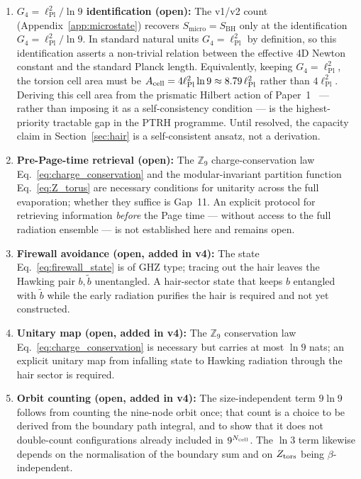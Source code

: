\documentclass[11pt,a4paper]{article}
\begin{document}
\begin{enumerate}[leftmargin=*, label=\arabic*.]
  \item \textbf{$G_4 = \ell_{\mathrm{Pl}}^2/\ln 9$ identification (open):}
    The v1/v2 count (Appendix~\ref{app:microstate}) recovers $S_{\mathrm{micro}} = S_{\mathrm{BH}}$
    only at the identification $G_4 = \ell_{\mathrm{Pl}}^2/\ln 9$.  In
    standard natural units $G_4 = \ell_{\mathrm{Pl}}^2$ by definition, so this
    identification asserts a non-trivial relation between the effective 4D Newton
    constant and the standard Planck length.  Equivalently, keeping $G_4 = \ell_{\mathrm{Pl}}^2$, the torsion
    cell area must be $A_{\rm cell} = 4\ell_{\mathrm{Pl}}^2\ln 9 \approx 8.79\,\ell_{\mathrm{Pl}}^2$
    rather than $4\ell_{\mathrm{Pl}}^2$. Deriving this cell area from the
    prismatic Hilbert action of Paper~1~\cite{BresslerPrismatic2026} --- rather
    than imposing it as a self-consistency condition --- is the highest-priority
    tractable gap in the PTRH programme.  Until resolved, the capacity
    claim in Section~\ref{sec:hair} is a self-consistent ansatz, not a
    derivation.

  \item \textbf{Pre-Page-time retrieval (open):} The $\mathbb{Z}_9$
    charge-conservation law Eq.~\eqref{eq:charge_conservation} and
    the modular-invariant partition function Eq.~\eqref{eq:Z_torus} are
    necessary conditions for unitarity across the full evaporation; whether
    they suffice is Gap~11.  An explicit protocol
    for retrieving information \emph{before} the Page time --- without
    access to the full radiation ensemble --- is not established here and
    remains open.

  \item \textbf{Firewall avoidance (open, added in v4):} The state
    Eq.~\eqref{eq:firewall_state} is of GHZ type; tracing out the hair leaves the
    Hawking pair $b,\tilde b$ unentangled.  A hair-sector state that keeps $b$
    entangled with $\tilde b$ while the early radiation purifies the hair is
    required and not yet constructed.

  \item \textbf{Unitary map (open, added in v4):} The $\mathbb{Z}_9$ conservation
    law Eq.~\eqref{eq:charge_conservation} is necessary but carries at most
    $\ln 9$ nats; an explicit unitary map from infalling state to Hawking radiation
    through the hair sector is required.

  \item \textbf{Orbit counting (open, added in v4):} The size-independent term
    $9\ln 9$ follows from counting the nine-node orbit once; that count is a
    choice to be derived from the boundary path integral, and to show that it does not
    double-count configurations already included in $9^{N_{\rm cell}}$. The $\ln 3$ term
    likewise depends on the normalisation of the boundary sum and on $Z_{\rm tors}$ being
    $\beta$-independent.


\end{enumerate}
\end{document}
